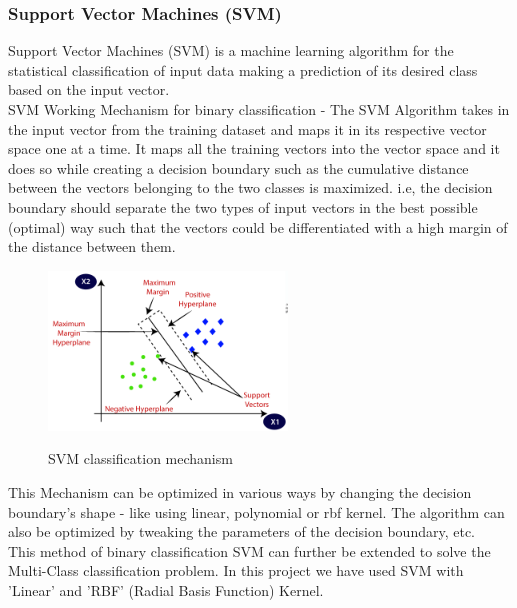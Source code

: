 \documentclass[conference]{IEEEtran}
\begin{document}
\subsubsection{Support Vector Machines (SVM)}
Support Vector Machines (SVM) is a machine learning algorithm for the statistical classification of input data making a prediction of its desired class based on the input vector.\cite{svm} \\
SVM Working Mechanism for binary classification - The SVM Algorithm takes in the input vector from the training dataset and maps it in its respective vector space one at a time. It maps all the training vectors into the vector space and it does so while creating a decision boundary such as the cumulative distance between the vectors belonging to the two classes is maximized. i.e, the decision boundary should separate the two types of input vectors in the best possible (optimal) way such that the vectors could be differentiated with a high margin of the distance between them.
\begin{figure}[htbp] %
\centering
\includegraphics[width=2.5in]{svm_image.PNG}
\label{SVM classification mechanism}
\caption{SVM classification mechanism}
\end{figure}

This Mechanism can be optimized in various ways by changing the decision boundary's shape - like using linear, polynomial or rbf kernel. The algorithm can also be optimized by tweaking the parameters of the decision boundary, etc. \\
This method of binary classification SVM can further be extended to solve the Multi-Class classification problem. In this project we have used SVM with 'Linear' and 'RBF' (Radial Basis Function) Kernel. \\
\end{document}
